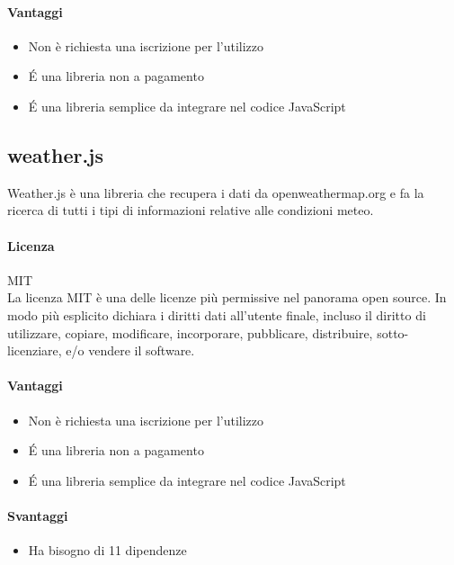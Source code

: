 \paragraph{Vantaggi}
\begin{itemize}
	\item Non è richiesta una iscrizione per l'utilizzo
	\item \'E una libreria non a pagamento
	\item \'E una libreria semplice da integrare nel codice JavaScript
\end{itemize}


\subsection{weather.js}

Weather.js è una libreria che recupera i dati da openweathermap.org e
fa la ricerca di tutti i tipi di informazioni relative alle condizioni
meteo. 

\paragraph{Licenza} MIT \\
La licenza MIT è una delle licenze più permissive nel panorama open
source. In modo più esplicito dichiara i diritti dati all'utente
finale, incluso il diritto di utilizzare, copiare, modificare,
incorporare, pubblicare, distribuire, sotto-licenziare, e/o vendere il
software. \\

\paragraph{Vantaggi}
\begin{itemize}
	\item Non è richiesta una iscrizione per l'utilizzo
	\item \'E una libreria non a pagamento
	\item \'E una libreria semplice da integrare nel codice JavaScript
\end{itemize}

\paragraph{Svantaggi} 
\begin{itemize}
	\item Ha bisogno di 11 dipendenze 
\end{itemize}


